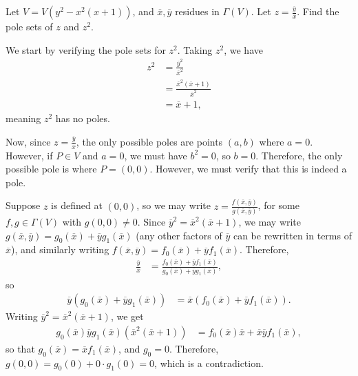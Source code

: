 \documentclass[10pt]{mypackage}
\begin{document}
\begin{exercise}[Exercise 2.17]
  Let $V = V\left( y^2 - x^2\left( x+1 \right) \right)$, and $ \overline{x}, \overline{y} $ residues in $\Gamma(V)$. Let $z = \frac{ \overline{y} }{ \overline{x} }$. Find the pole sets of $z$ and $z^2$.
\end{exercise}
\begin{solution}
  We start by verifying the pole sets for $z^2$. Taking $z^2$, we have
  \begin{align*}
    z^2 &= \frac{ \overline{y}^2 }{ \overline{x}^2}\\
        &= \frac{ \overline{x}^2\left( \overline{x} + 1 \right) }{ \overline{x}^2 }\\
        &= \overline{x} + 1,
  \end{align*}
  meaning $z^2$ has no poles.\newline

  Now, since $z = \frac{ \overline{y} }{ \overline{x} }$, the only possible poles are points $\left( a,b \right)$ where $a = 0$. However, if $P\in V$ and $a = 0$, we must have $b^2 = 0$, so $b = 0$. Therefore, the only possible pole is where $P = (0,0)$. However, we must verify that this is indeed a pole.\newline

  Suppose $z$ is defined at $(0,0)$, so we may write $z = \frac{f\left( \overline{x}, \overline{y} \right)}{g\left( \overline{x}, \overline{y} \right)}$, for some $f,g\in \Gamma(V)$ with $g(0,0)\neq 0$. Since $ \overline{y}^2 = \overline{x}^2 \left( \overline{x} + 1 \right) $, we may write $g\left( \overline{x}, \overline{y} \right) = g_0\left(  \overline{x} \right) + \overline{y}g_1\left( \overline{x} \right)$ (any other factors of $ \overline{y} $ can be rewritten in terms of $ \overline{x} $), and similarly writing $f\left( \overline{x}, \overline{y} \right) = f_0\left( \overline{x} \right) + \overline{y}f_1\left( \overline{x} \right)$. Therefore,
  \begin{align*}
    \frac{ \overline{y} }{ \overline{x} } &= \frac{f_0\left( \overline{x} \right) + \overline{y}f_1\left(  \overline{x} \right)}{ g_0\left( \overline{x} \right) + \overline{y} g_1\left( \overline{x} \right) },
  \end{align*}
  so
  \begin{align*}
    \overline{y}\left( g_0\left( \overline{x} \right) + \overline{y}g_1\left( \overline{x} \right) \right) &= \overline{x}\left( f_0\left( \overline{x} \right) + \overline{y}f_1\left( \overline{x} \right) \right).
  \end{align*}
  Writing $ \overline{y}^2 = \overline{x}^2\left( \overline{x} + 1 \right) $, we get
  \begin{align*}
    g_0\left( \overline{x} \right) \overline{y} g_1\left( \overline{x} \right)\left( \overline{x}^2\left( \overline{x} + 1 \right) \right) &= f_0\left( \overline{x} \right) \overline{x} + \overline{x} \overline{y} f_1\left( \overline{x} \right),
  \end{align*}
  so that $g_0\left( \overline{x} \right) = \overline{x}f_1\left( \overline{x} \right)$, and $g_0 = 0$. Therefore, $g\left( 0,0 \right) = g_0(0) + 0\cdot g_1(0) = 0$, which is a contradiction.
\end{solution}
\end{document}
